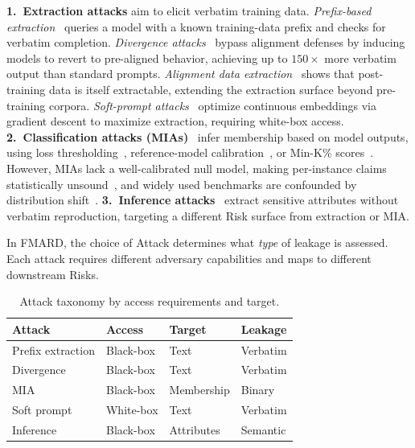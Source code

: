 \documentclass[11pt]{article}
\begin{document}
\textbf{1.~Extraction attacks} aim to elicit verbatim training data.
\textit{Prefix-based extraction}~\citep{carlini2021extractingtrainingdatalarge}
queries a model with a known training-data prefix and checks for verbatim
completion.
\textit{Divergence attacks}~\citep{nasr2023scalableextractiontrainingdata}
bypass alignment defenses by inducing models to revert to pre-aligned
behavior, achieving up to $150\times$ more verbatim output than standard
prompts.
\textit{Alignment data extraction}~\citep{barbero2025extractingalignmentdataopen}
shows that post-training data is itself extractable, extending the extraction
surface beyond pre-training corpora.
\textit{Soft-prompt attacks}~\citep{ozdayi2023controllingextractionmemorizeddata,
kim2023propile} optimize continuous embeddings via gradient descent to
maximize extraction, requiring white-box access.
\textbf{2.~Classification attacks (MIAs)}~\citep{shokri2017membership} infer
membership based on model outputs, using loss thresholding~\citep{yeom2018privacy},
reference-model calibration~\citep{carlini2022membership}, or Min-K\%
scores~\citep{shi2023detecting}.
However, MIAs lack a well-calibrated null model, making per-instance claims
statistically unsound~\citep{zhang2025membershipinferenceattacksprove}, and
widely used benchmarks are confounded by distribution
shift~\citep{meeus2025sok}.
\textbf{3.~Inference attacks}~\citep{staab2024memorizationviolatingprivacyinference}
extract sensitive attributes without verbatim reproduction, targeting a
different Risk surface from extraction or MIA\@.

In FMARD, the choice of Attack determines what \textit{type} of leakage is
assessed.
Each attack requires different adversary capabilities and maps to different
downstream Risks.

\begin{table}[t]
\centering
\small
\begin{tabular}{@{}llll@{}}
\toprule
\textbf{Attack} & \textbf{Access} & \textbf{Target} & \textbf{Leakage} \\
\midrule
Prefix extraction    & Black-box  & Text       & Verbatim \\
Divergence           & Black-box  & Text       & Verbatim \\
MIA                  & Black-box  & Membership & Binary \\
Soft prompt          & White-box  & Text       & Verbatim \\
Inference            & Black-box  & Attributes & Semantic \\
\bottomrule
\end{tabular}
\caption{Attack taxonomy by access requirements and target.}
\label{tab:attacks}
\end{table}
\end{document}
